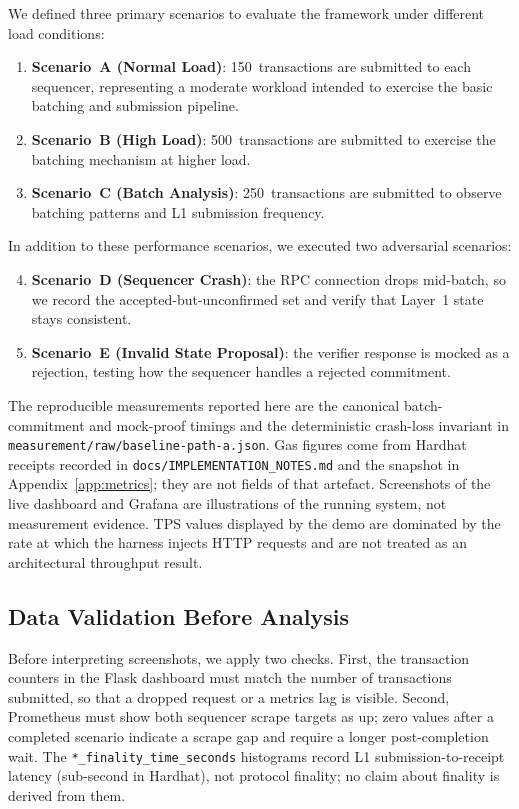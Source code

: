 We defined three primary scenarios to evaluate the framework under different load conditions:

\begin{enumerate}
    \item \textbf{Scenario~A (Normal Load)}: 150~transactions are submitted to each sequencer, representing a moderate workload intended to exercise the basic batching and submission pipeline.
    \item \textbf{Scenario~B (High Load)}: 500~transactions are submitted to exercise the batching mechanism at higher load.
    \item \textbf{Scenario~C (Batch Analysis)}: 250~transactions are submitted to observe batching patterns and L1 submission frequency.
\end{enumerate}

In addition to these performance scenarios, we executed two adversarial scenarios:

\begin{enumerate}
    \setcounter{enumi}{3}
    \item \textbf{Scenario~D (Sequencer Crash)}: the RPC connection drops mid-batch, so we record the accepted-but-unconfirmed set and verify that Layer~1 state stays consistent.
    \item \textbf{Scenario~E (Invalid State Proposal)}: the verifier response is mocked as a rejection, testing how the sequencer handles a rejected commitment.
\end{enumerate}

The reproducible measurements reported here are the canonical batch-commitment and mock-proof timings and the deterministic crash-loss invariant in \texttt{measurement/raw/baseline-path-a.json}. Gas figures come from Hardhat receipts recorded in \texttt{docs/IMPLEMENTATION\_NOTES.md} and the snapshot in Appendix~\ref{app:metrics}; they are not fields of that artefact. Screenshots of the live dashboard and Grafana are illustrations of the running system, not measurement evidence. TPS values displayed by the demo are dominated by the rate at which the harness injects HTTP requests and are not treated as an architectural throughput result.

\subsection{Data Validation Before Analysis}

Before interpreting screenshots, we apply two checks. First, the transaction counters in the Flask dashboard must match the number of transactions submitted, so that a dropped request or a metrics lag is visible. Second, Prometheus must show both sequencer scrape targets as up; zero values after a completed scenario indicate a scrape gap and require a longer post-completion wait. The \texttt{*\_finality\_time\_seconds} histograms record L1 submission-to-receipt latency (sub-second in Hardhat), not protocol finality; no claim about finality is derived from them.

